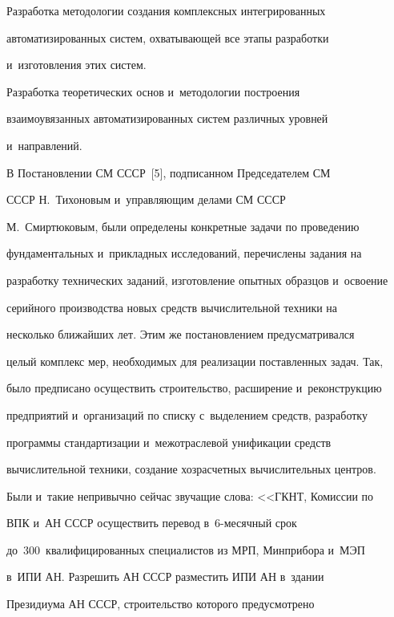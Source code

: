      

     Разработка методологии создания комплексных интегрированных 

автоматизированных сис\-тем, охватывающей все этапы разработки 

и~из\-го\-тов\-ле\-ния этих сис\-тем.

     

     Разработка теоретических основ и~методологии по\-стро\-ения 

взаимоувязанных автоматизированных сис\-тем различных уров\-ней  

и~на\-прав\-ле\-ний.

   

   В Постановлении СМ СССР~[5], подписанном Председателем СМ 

\mbox{СССР} Н.~Тихоновым и~управ\-ля\-ющим делами СМ \mbox{СССР} 

М.~Смир\-тю\-ко\-вым, были определены конкретные задачи по проведению 

фундаментальных и~при\-клад\-ных исследований, пе\-ре\-чис\-ле\-ны задания на 

разработку технических заданий, изготовление опыт\-ных образцов и~освоение 

серийного производства новых средств вы\-чис\-ли\-тель\-ной техники на 

несколько ближайших лет. Этим же по\-ста\-нов\-ле\-ни\-ем предусмат\-ри\-вал\-ся 

целый комплекс мер, необходимых для реализации по\-став\-лен\-ных задач. Так, 

было предписано осуществить строительство, расширение и~реконструкцию 

предприятий и~организаций по спис\-ку с~выделением средств, разработку 

программы стандартизации и~межотраслевой унификации средств 

вы\-чис\-ли\-тель\-ной техники, создание хозрасчетных вы\-чис\-ли\-тель\-ных цент\-ров. 

Были и~такие непривычно сейчас звучащие слова: <<ГКНТ, Комиссии по 

ВПК и~АН \mbox{СССР} осуществить перевод в~6-ме\-сяч\-ный срок 

до~300~квалифицированных специалистов из МРП, Минприбора и~МЭП 

в~ИПИ АН. Разрешить АН \mbox{СССР} раз\-мес\-тить ИПИ АН в~здании 

Президиума АН \mbox{СССР}, строительство которого предусмот\-ре\-но 

